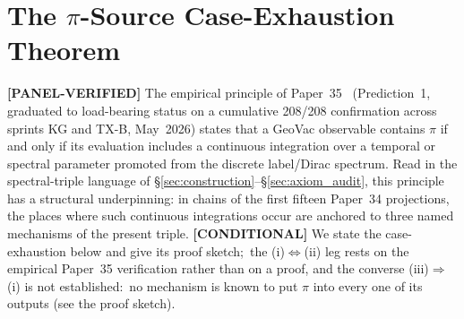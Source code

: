 \documentclass[11pt]{article}
\begin{document}
\section{The $\pi$-Source Case-Exhaustion Theorem}
\label{sec:pi_source_theorem}

\textbf{[PANEL-VERIFIED]} The empirical principle of Paper~35~\cite{paper35} (Prediction~1,
graduated to load-bearing status on a cumulative 208/208 confirmation
across sprints KG and TX-B, May~2026) states that a GeoVac observable
contains $\pi$ if and only if its evaluation includes a continuous
integration over a temporal or spectral parameter promoted from the
discrete label/Dirac spectrum.  Read in the spectral-triple language of
\S\ref{sec:construction}--\S\ref{sec:axiom_audit}, this principle has
a structural underpinning: in chains of the first fifteen Paper~34
projections, the places where such continuous integrations occur are
anchored to three named mechanisms of the present triple.  \textbf{[CONDITIONAL]} We state the
case-exhaustion below and give its proof sketch;\ the
(i)$\Leftrightarrow$(ii) leg rests on the empirical Paper~35
verification rather than on a proof, and the converse
(iii)$\Rightarrow$(i) is not established:\ no mechanism is
known to put $\pi$ into every one of its outputs (see the proof sketch).
\end{document}
